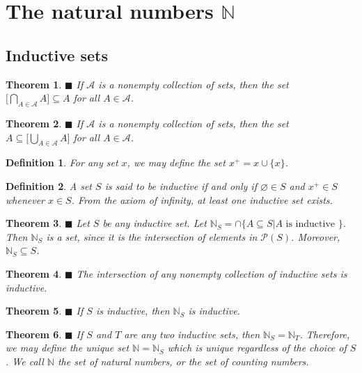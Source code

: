 \documentclass[a4paper]{article}
\newtheorem{mytheorem}{Theorem}
\newtheorem{mydef}{Definition}
\numberwithin{mytheorem}{section}
\numberwithin{mydef}{section}
\numberwithin{axiom}{section}
\numberwithin{example}{section}
\newcommand{\done}{$\blacksquare$ }
\begin{document}
\section{The natural numbers $\mathbb{N}$}

\subsection{Inductive sets}

\begin{mytheorem} \done If $\mathcal{A}$ is a nonempty collection of sets, then the set  $\Big[\bigcap\limits_{A \in \mathcal{A}} A\Big] \subseteq A$ for all $A \in \mathcal{A}$.
\end{mytheorem}

\begin{mytheorem} \done If $\mathcal{A}$ is a nonempty collection of sets, then the set  $A \subseteq \Big[\bigcup\limits_{A \in \mathcal{A}} A\Big]$ for all $A \in \mathcal{A}$.
\end{mytheorem}

\begin{mydef} For any set $x$, we may define the set $x^{+} = x \cup \{ x \} $. 
\end{mydef}

\begin{mydef} A set $S$ is said to be inductive if and only if $\varnothing \in S$ and $x^{+} \in S$ whenever $x \in S$. From the axiom of infinity, at least one inductive set exists.
\end{mydef}

\begin{mytheorem} \done Let $S$ be any inductive set. Let $\mathbb{N}_{S} = \cap \{ A \subseteq S | A \text{ is inductive } \} $. Then $\mathbb{N}_{S}$ is a set, since it is the intersection of elements in $\mathcal{P}(S)$. Moreover, $\mathbb{N}_{S} \subseteq S$.
\end{mytheorem}

\begin{mytheorem} \done The intersection of any nonempty collection of inductive sets is inductive.
\end{mytheorem}

\begin{mytheorem} \done If $S$ is inductive, then $\mathbb{N}_{S}$ is inductive.
\end{mytheorem}

\begin{mytheorem}\done If $S$ and $T$ are any two inductive sets, then  $\mathbb{N}_{S} =  \mathbb{N}_{T}$. Therefore, we may define the unique set $\mathbb{N} = \mathbb{N}_{S}$ which is unique regardless of the choice of $S$. We call $\mathbb{N}$ the set of natural numbers, or the set of counting numbers.
\end{mytheorem}
\end{document}
